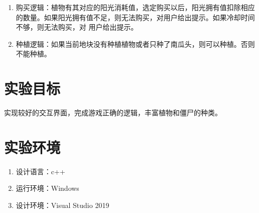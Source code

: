 \documentclass[12pt,a4paper,UTF8]{article}
\begin{document}
\begin{enumerate}
          \item 购买逻辑：植物有其对应的阳光消耗值，选定购买以后，阳光拥有值扣除相应的数量。如果阳光拥有值不足，则无法购买，对用户给出提示。如果冷却时间不够，则无法购买，对
          用户给出提示。
          \item 种植逻辑：如果当前地块没有种植植物或者只种了南瓜头，则可以种植。否则不能种植。
          
        \end{enumerate}
    

\section{实验目标}
    实现较好的交互界面，完成游戏正确的逻辑，丰富植物和僵尸的种类。

\section{实验环境}
\begin{enumerate}
  \item 设计语言：c++
  \item 运行环境：Windows
  \item 设计环境：Visual Studio 2019
\end{enumerate}
  
\end{document}
